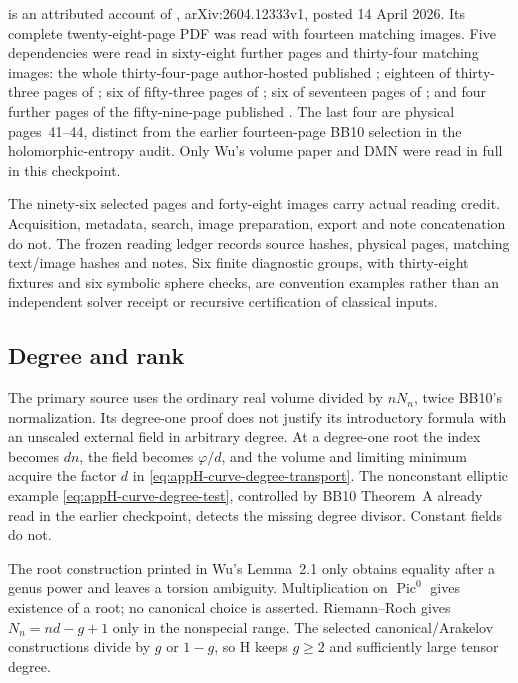  is an attributed account of
\cite{Wu26SectionBallRatesV1}, arXiv:2604.12333v1, posted
14 April 2026. Its complete twenty-eight-page PDF was read
with fourteen matching images. Five dependencies were read
in sixty-eight further pages and thirty-four matching images:
the whole thirty-four-page author-hosted published
\cite{DMN17FeketePublished}; eighteen of thirty-three pages
of \cite{Klevtsov19LaughlinV3}; six of fifty-three pages of
\cite{Zelditch11ZerosV1}; six of seventeen pages of
\cite{Wu25HoleProbabilityV1}; and four further pages of the
fifty-nine-page published \cite{BB10}. The last four are
physical pages~41--44, distinct from the earlier fourteen-page
BB10 selection in the holomorphic-entropy audit. Only Wu's
volume paper and DMN were read in full in this checkpoint.

The ninety-six selected pages and forty-eight images carry
actual reading credit. Acquisition, metadata, search, image
preparation, export and note concatenation do not. The frozen
reading ledger records source hashes, physical pages, matching
text/image hashes and notes. Six finite diagnostic groups,
with thirty-eight fixtures and six symbolic sphere checks,
are convention examples rather than an independent solver
receipt or recursive certification of classical inputs.

\subsection{Degree and rank}

The primary source uses the ordinary real volume divided by
$nN_n$, twice BB10's normalization. Its degree-one proof
does not justify its introductory formula with an unscaled
external field in arbitrary degree. At a degree-one root the
index becomes $dn$, the field becomes $\varphi/d$, and the
volume and limiting minimum acquire the factor $d$ in
\eqref{eq:appH-curve-degree-transport}. The nonconstant elliptic
example \eqref{eq:appH-curve-degree-test}, controlled by BB10
Theorem~A already read in the earlier checkpoint, detects
the missing degree divisor. Constant fields do not.

The root construction printed in Wu's Lemma~2.1 only obtains
equality after a genus power and leaves a torsion ambiguity.
Multiplication on $\operatorname{Pic}^0$ gives existence of a
root; no canonical choice is asserted. Riemann--Roch gives
$N_n=nd-g+1$ only in the nonspecial range. The selected
canonical/Arakelov constructions divide by $g$ or $1-g$, so
H keeps $g\geq2$ and sufficiently large tensor degree.

